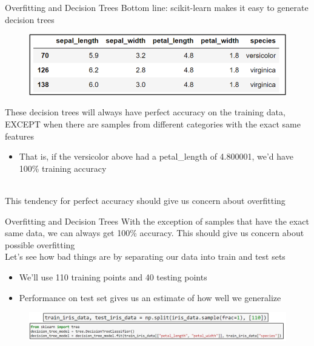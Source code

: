 \documentclass[aspectratio=169]{../latex_main/tntbeamer}  %
\begin{document}
	
	
	\begin{frame}{Overfitting and Decision Trees}
	    Bottom line: scikit-learn makes it easy to generate decision trees
	    \begin{figure}
	        \includegraphics[scale=.5]{Bild29}
	    \end{figure}
	    These decision trees will always have perfect accuracy on the training data, EXCEPT when there are samples from different categories with the exact same features
	    \begin{itemize}
	        \item That is, if the versicolor above had a petal\_length of 4.800001, we’d have 100\% training accuracy
	    \end{itemize}
	    \\
	    \bigskip
	    This tendency for perfect accuracy should give us concern about overfitting
	\end{frame}
	
	
		\begin{frame}{Overfitting and Decision Trees}
	    With the exception of samples that have the exact same data, we can always get 100\% accuracy. This should give us concern about possible overfitting\\
	    \bigskip
	    Let’s see how bad things are by separating our data into train and test sets
	    \begin{itemize}
	        \item We’ll use 110 training points and 40 testing points
	        \item Performance on test set gives us an estimate of how well we generalize
	    \end{itemize}
	    \begin{figure}
	        \centering
	        \includegraphics[scale=.4]{Bild30}
	    \end{figure}
	\end{frame}
	
\end{document}
